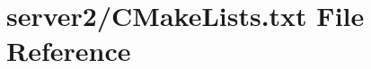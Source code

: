 \hypertarget{server2_2CMakeLists_8txt}{}\section{server2/\+C\+Make\+Lists.txt File Reference}
\label{server2_2CMakeLists_8txt}
